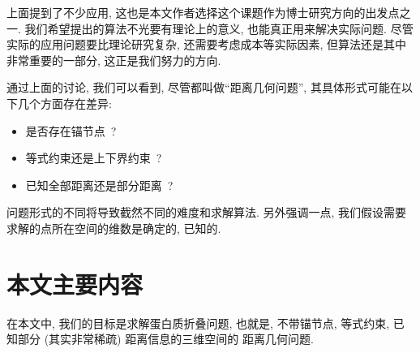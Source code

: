 上面提到了不少应用, 这也是本文作者选择这个课题作为博士研究方向的出发点之一.
我们希望提出的算法不光要有理论上的意义, 也能真正用来解决实际问题.
尽管实际的应用问题要比理论研究复杂, 还需要考虑成本等实际因素,
但算法还是其中非常重要的一部分, 这正是我们努力的方向.

通过上面的讨论, 我们可以看到, 
尽管都叫做``距离几何问题'', 其具体形式可能在以下几个方面存在差异:
\begin{itemize}
  \item 是否存在锚节点~?
  \item 等式约束还是上下界约束~?
  \item 已知全部距离还是部分距离~?
\end{itemize}
问题形式的不同将导致截然不同的难度和求解算法.
另外强调一点, 我们假设需要求解的点所在空间的维数是确定的, 已知的.


 
\section{本文主要内容}

在本文中, 我们的目标是求解蛋白质折叠问题,
也就是, 不带锚节点, 等式约束, 
已知部分 (其实非常稀疏) 距离信息的三维空间的
距离几何问题.


